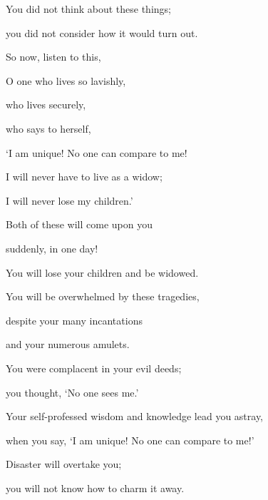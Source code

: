 {\par }{\Q You did not think
about these
things;

\par }{\Q you did not consider
how it
would turn
out.
\par }{\Q {}So now,
listen
to this,
\par }{\Q O one who lives so lavishly,
\par }{\Q who lives
securely,
\par }{\Q who says
to herself,
\par }{\Q ‘I am
unique! No one can compare
to me!

\par }{\Q I will never
have to live
as a widow;
\par }{\Q I will never
lose my children.’
\par }{\Q {}Both
of these
will come
upon you
\par }{\Q suddenly,
in one
day!
\par }{\Q You will lose your children
and be widowed.
\par }{\Q You will be overwhelmed
by
these tragedies,
\par }{\Q despite your many
incantations
\par }{\Q and your numerous
amulets.
\par }{\Q {}You were complacent
in your evil
deeds;

\par }{\Q you thought, ‘No
one sees
me.’
\par }{\Q Your self-professed
wisdom
and knowledge
lead you astray,
\par }{\Q when you say,
‘I am
unique! No
one can compare to me!’
\par }{\Q {}Disaster
will overtake
you;
\par }{\Q you will not
know
how to charm
it away.

}
